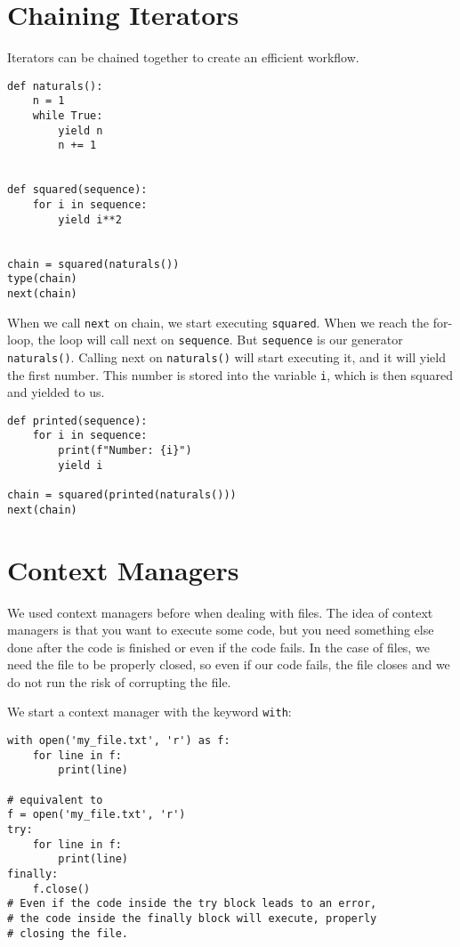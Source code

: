 \documentclass[12pt, a4paper]{article}
\begin{document}
\section{Chaining Iterators}
\label{sec:orgd1ba3d7}
Iterators can be chained together to create an efficient workflow.
\lstset{language=jupyter-python,label= ,caption= ,captionpos=b,numbers=none}
\begin{lstlisting}
def naturals():
    n = 1
    while True:
        yield n
        n += 1


def squared(sequence):
    for i in sequence:
        yield i**2


chain = squared(naturals())
type(chain)
next(chain)
\end{lstlisting}

When we call \texttt{next} on chain, we start executing \texttt{squared}.
When we reach the for-loop, the loop will call next on \texttt{sequence}.
But \texttt{sequence} is our generator \texttt{naturals()}.
Calling next on \texttt{naturals()} will start executing it, and it will yield the first number.
This number is stored into the variable \texttt{i}, which is then squared and yielded to us.
\lstset{language=jupyter-python,label= ,caption= ,captionpos=b,numbers=none}
\begin{lstlisting}
def printed(sequence):
    for i in sequence:
        print(f"Number: {i}")
        yield i

chain = squared(printed(naturals()))
next(chain)
\end{lstlisting}
\section{Context Managers}
\label{sec:org0e0cb99}
We used context managers before when dealing with files.
The idea of context managers is that you want to execute some code, but you need something else done after the code is finished or even if the code fails.
In the case of files, we need the file to be properly closed, so even if our code fails, the file closes and we do not run the risk of corrupting the file.

We start a context manager with the keyword \texttt{with}:
\lstset{language=jupyter-python,label= ,caption= ,captionpos=b,numbers=none}
\begin{lstlisting}
with open('my_file.txt', 'r') as f:
    for line in f:
        print(line)

# equivalent to
f = open('my_file.txt', 'r')
try:
    for line in f:
        print(line)
finally:
    f.close()
# Even if the code inside the try block leads to an error,
# the code inside the finally block will execute, properly
# closing the file.
\end{lstlisting}
\end{document}
